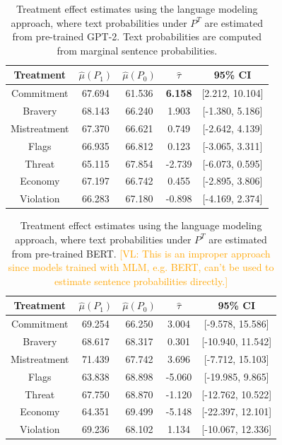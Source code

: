 \documentclass{article}
\newcommand{\vl}[1]{\textcolor{orange}{[VL: #1]}}
\begin{document}
\begin{table}[!ht]
    \centering
    \begin{tabular}{c|cccc}
        \toprule
        Treatment & $\hat{\mu}(P_1)$ & $\hat{\mu}(P_0)$ & $\hat{\tau}$ & 95\% CI \\
        \midrule
        Commitment & 67.694 & 61.536 & \textbf{\textcolor{green!50!black}{6.158}} & [2.212, 10.104] \\
        Bravery & 68.143 & 66.240 & \textcolor{green!50!black}{1.903} & [-1.380, 5.186] \\
        Mistreatment & 67.370 & 66.621 & \textcolor{green!50!black}{0.749} & [-2.642, 4.139] \\
        Flags & 66.935 & 66.812 & \textcolor{green!50!black}{0.123} & [-3.065, 3.311] \\
        Threat & 65.115 & 67.854 & \textcolor{red!80!black}{-2.739} & [-6.073, 0.595] \\
        Economy & 67.197 & 66.742 & \textcolor{green!50!black}{0.455} & [-2.895, 3.806] \\
        Violation & 66.283 & 67.180 & \textcolor{red!80!black}{-0.898} & [-4.169, 2.374] \\
        \bottomrule
    \end{tabular}
    \caption{Treatment effect estimates using the language modeling approach, where text probabilities under $P^T$ are estimated from pre-trained GPT-2. Text probabilities are computed from marginal sentence probabilities.}
    \label{tab:results_lm3_old}
\end{table}

\begin{table}[!ht]
    \centering
    \begin{tabular}{c|cccc}
        \toprule
        Treatment & $\hat{\mu}(P_1)$ & $\hat{\mu}(P_0)$ & $\hat{\tau}$ & 95\% CI \\
        \midrule
        Commitment & 69.254 & 66.250 & \textcolor{green!50!black}{3.004} & [-9.578, 15.586] \\
        Bravery & 68.617 & 68.317 & \textcolor{green!50!black}{0.301} & [-10.940, 11.542] \\
        Mistreatment & 71.439 & 67.742 & \textcolor{green!50!black}{3.696} & [-7.712, 15.103] \\
        Flags & 63.838 & 68.898 & \textcolor{red!80!black}{-5.060} & [-19.985, 9.865] \\
        Threat & 67.750 & 68.870 & \textcolor{red!80!black}{-1.120} & [-12.762, 10.522] \\
        Economy & 64.351 & 69.499 & \textcolor{red!80!black}{-5.148} & [-22.397, 12.101] \\
        Violation & 69.236 & 68.102 & \textcolor{green!50!black}{1.134} & [-10.067, 12.336] \\
        \bottomrule
    \end{tabular}
    \caption{Treatment effect estimates using the language modeling approach, where text probabilities under $P^T$ are estimated from pre-trained BERT. \vl{This is an improper approach since models trained with MLM, e.g. BERT, can't be used to estimate sentence probabilities directly.}}
    \label{tab:results_lm1}
\end{table}



\end{document}
